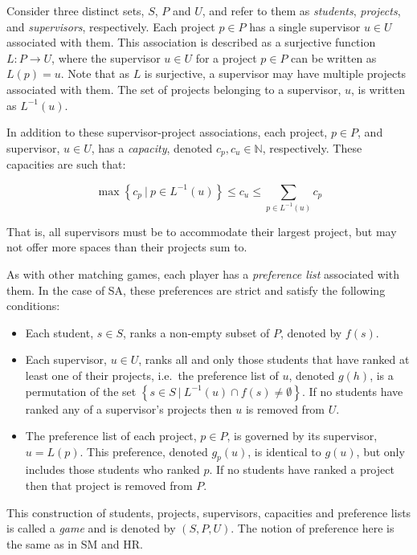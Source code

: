 \begin{definition}\label{def:sa_game}
    Consider three distinct sets, \(S\), \(P\) and \(U\), and refer to them as
    \emph{students}, \emph{projects}, and \emph{supervisors}, respectively. Each
    project \(p \in P\) has a single supervisor \(u \in U\) associated with
    them. This association is described as a surjective function \(L: P \to U\),
    where the supervisor \(u \in U\) for a project \(p \in P\) can be written as
    \(L(p) = u\). Note that as \(L\) is surjective, a supervisor may have
    multiple projects associated with them. The set of projects belonging to a
    supervisor, \(u\), is written as \(L^{-1}(u)\).

    In addition to these supervisor-project associations, each project, \(p \in
    P\), and supervisor, \(u \in U\), has a \emph{capacity}, denoted \(c_p, c_u
    \in \mathbb N\), respectively. These capacities are such that:

    \begin{equation}
        \max \left\{c_p \ | \ p \in L^{-1}(u)\right\}
        \le c_u
        \le \sum_{p \in L^{-1}(u)} c_p
    \end{equation}

    That is, all supervisors must be to accommodate their largest project, but
    may not offer more spaces than their projects sum to.

    As with other matching games, each player has a \emph{preference list}
    associated with them. In the case of SA, these preferences are strict and
    satisfy the following conditions:

    \begin{itemize}
        \item Each student, \(s \in S\), ranks a non-empty subset of \(P\),
            denoted by \(f(s)\).
        \item Each supervisor, \(u \in U\), ranks all and only those students
            that have ranked at least one of their projects, i.e.\ the
            preference list of \(u\), denoted \(g(h)\), is a permutation of the
            set
            \(\left\{s \in S \ | \ L^{-1}(u) \cap f(s) \neq \emptyset\right\}\).
            If no students have ranked any of a supervisor's projects then \(u\)
            is removed from \(U\).
        \item The preference list of each project, \(p \in P\), is governed by
            its supervisor, \(u = L(p)\). This preference, denoted \(g_p (u)\),
            is identical to \(g(u)\), but only includes those students who
            ranked \(p\). If no students have ranked a project then that project
            is removed from \(P\).
    \end{itemize}

    This construction of students, projects, supervisors, capacities and
    preference lists is called a \emph{game} and is denoted by \((S, P, U)\).
    The notion of preference here is the same as in SM and HR.
\end{definition}

